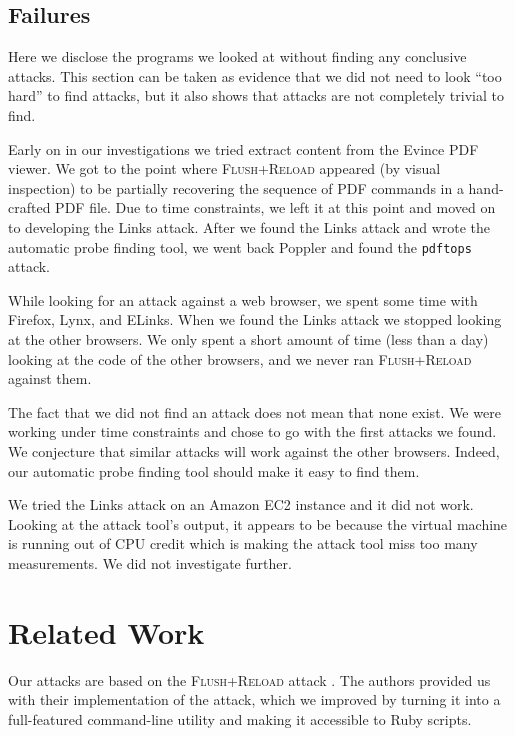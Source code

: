 \documentclass[letterpaper,twocolumn,10pt]{article}
\begin{document}
\subsection{Failures}
\label{sec:failures}

Here we disclose the programs we looked at without finding any conclusive
attacks. This section can be taken as evidence that we did not need to look
``too hard'' to find attacks, but it also shows that attacks are not completely
trivial to find.

Early on in our investigations we tried extract content from the Evince PDF
viewer. We got to the point where \textsc{Flush+Reload} appeared (by visual
inspection) to be partially recovering the sequence of PDF commands in
a hand-crafted PDF file. Due to time constraints, we left it at this point and
moved on to developing the Links attack. After we found the Links attack and
wrote the automatic probe finding tool, we went back Poppler and found the
\texttt{pdftops} attack.

While looking for an attack against a web browser, we spent some time with
Firefox, Lynx, and ELinks. When we found the Links attack we stopped looking at
the other browsers. We only spent a short amount of time (less than a day)
looking at the code of the other browsers, and we never ran
\textsc{Flush+Reload} against them.

The fact that we did not find an attack does not mean that none exist. We were
working under time constraints and chose to go with the first attacks we found.
We conjecture that similar attacks will work against the other browsers. Indeed,
our automatic probe finding tool should make it easy to find them.

We tried the Links attack on an Amazon EC2 instance and it did not work. Looking
at the attack tool's output, it appears to be because the virtual machine is
running out of CPU credit which is making the attack tool miss too many
measurements. We did not investigate further.

\section{Related Work}
\label{sec:relwork}

Our attacks are based on the \textsc{Flush+Reload} attack \cite{yarom2013flush}.
The authors provided us with their implementation of the attack, which we
improved by turning it into a full-featured command-line utility and making it
accessible to Ruby scripts.
\end{document}
